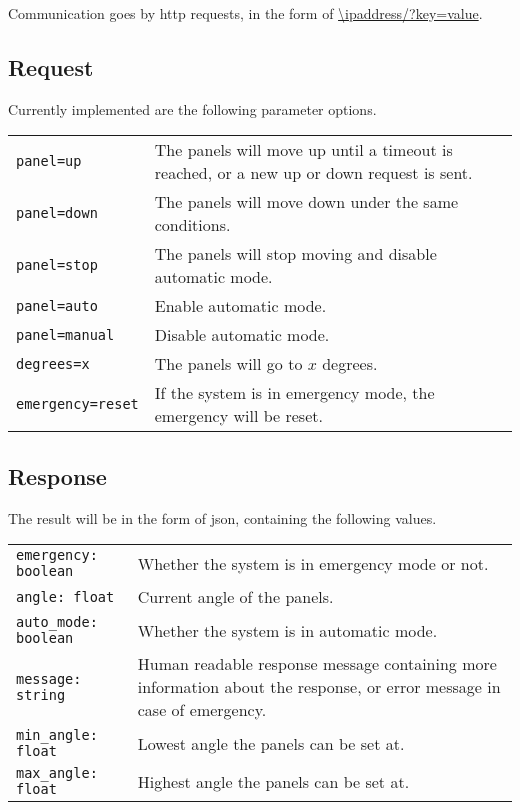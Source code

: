 

Communication goes by http requests, in the form of \url{\ipaddress/?key=value}.

\subsection{Request}
Currently implemented are the following parameter options.

\begin{tabular}{ll}
    \verb|panel=up| & The panels will move up until a timeout is reached, or a new up or down request is sent. \\
    \verb|panel=down| & The panels will move down under the same conditions. \\
    \verb|panel=stop| & The panels will stop moving and disable automatic mode. \\
    \verb|panel=auto| & Enable automatic mode. \\
    \verb|panel=manual| & Disable automatic mode. \\
    \verb|degrees=x| & The panels will go to $x$ degrees. \\
    \verb|emergency=reset| & If the system is in emergency mode, the emergency will be reset. \\
\end{tabular}

\subsection{Response}

The result will be in the form of json, containing the following values.

\begin{tabular}{ll}
    \verb|emergency: boolean| & Whether the system is in emergency mode or not. \\
    \verb|angle: float| & Current angle of the panels. \\
    \verb|auto_mode: boolean| & Whether the system is in automatic mode. \\
    \verb|message: string| & Human readable response message containing more information about the response, or error message in case of emergency. \\
    \verb|min_angle: float| & Lowest angle the panels can be set at. \\
    \verb|max_angle: float| & Highest angle the panels can be set at. \\
\end{tabular}

